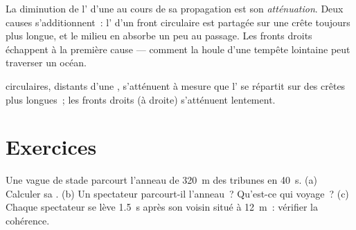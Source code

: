 \begin{definition}[Atténuation]\label{def:g12:mechanical-waves:attenuation}
La diminution de l' d'une  au cours de sa
propagation est son \emph{atténuation}. Deux causes
s'additionnent~: l' d'un front circulaire est
partagée sur une crête toujours plus longue, et le milieu en absorbe un
peu au passage. Les fronts droits échappent à la première
cause --- comment la houle d'une tempête lointaine peut traverser un
océan.
\end{definition}

\begin{omfigure}

{\small {} circulaires, distants d'une
, s'atténuent à mesure que l'
se répartit sur des crêtes plus longues~; les fronts droits (à droite)
s'atténuent lentement.}
\end{omfigure}

\section{Exercices}

\begin{exercise}[$\star$]\label{exo:g12:mechanical-waves:1}
Une vague de stade parcourt l'anneau de \qty{320}{m} des tribunes
en \qty{40}{s}.
(a) Calculer sa . (b) Un spectateur parcourt-il l'anneau~?
Qu'est-ce qui voyage~? (c) Chaque spectateur se lève \qty{1.5}{s} après
son voisin situé à \qty{12}{m}~: vérifier la cohérence.
\end{exercise}

